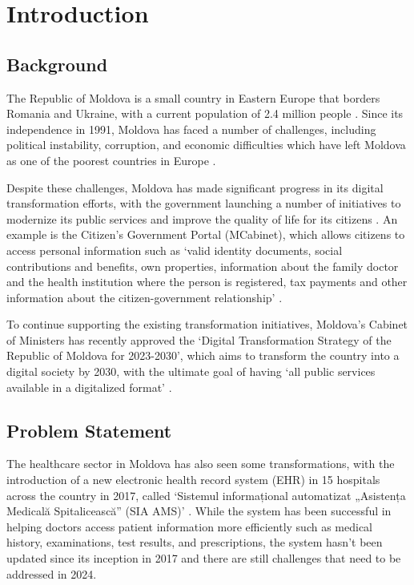 \chapter{Introduction}
\label{chap:introduction}

\section{Background}

The Republic of Moldova is a small country in Eastern Europe that borders Romania and Ukraine, with a current population of 2.4 million people \parencite{mdpop}. Since its independence in 1991, Moldova has faced a number of challenges, including political instability, corruption, and economic difficulties which have left Moldova as one of the poorest countries in Europe \parencite{mdpoverty}. 

Despite these challenges, Moldova has made significant progress in its digital transformation efforts, with the government launching a number of initiatives to modernize its public services and improve the quality of life for its citizens \parencite{mdega}. An example is the Citizen's Government Portal (MCabinet), which allows citizens to access personal information such as `valid identity documents, social contributions and benefits, own properties, information about the family doctor and the health institution where the person is registered, tax payments and other information about the citizen-government relationship' \parencite{mdcabinet}. 

To continue supporting the existing transformation initiatives, Moldova's Cabinet of Ministers has recently approved the `Digital Transformation Strategy of the Republic of Moldova for 2023-2030', which aims to transform the country into a digital society by 2030, with the ultimate goal of having `all public services available in a digitalized format' \parencite{mdstrategy}.

\section{Problem Statement}

The healthcare sector in Moldova has also seen some transformations, with the introduction of a new electronic health record system (EHR) in 15 hospitals across the country in 2017, called `Sistemul informațional automatizat „Asistența Medicală Spitalicească” (SIA AMS)' \parencite{mdehr}. While the system has been successful in helping doctors access patient information more efficiently such as medical history, examinations, test results, and prescriptions, the system hasn't been updated since its inception in 2017 and there are still challenges that need to be addressed in 2024. 

